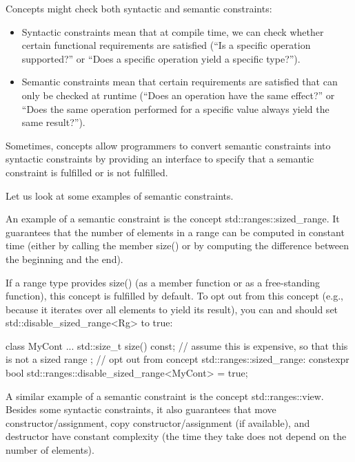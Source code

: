 
Concepts might check both syntactic and semantic constraints:

\begin{itemize}
\item
Syntactic constraints mean that at compile time, we can check whether certain functional requirements are satisfied (“Is a specific operation supported?” or “Does a specific operation yield a specific type?”).

\item
Semantic constraints mean that certain requirements are satisfied that can only be checked at runtime (“Does an operation have the same effect?” or “Does the same operation performed for a specific value always yield the same result?”).
\end{itemize}

Sometimes, concepts allow programmers to convert semantic constraints into syntactic constraints by providing an interface to specify that a semantic constraint is fulfilled or is not fulfilled.


Let us look at some examples of semantic constraints.


An example of a semantic constraint is the concept std::ranges::sized\_range. It guarantees that the number of elements in a range can be computed in constant time (either by calling the member size() or by computing the difference between the beginning and the end).

If a range type provides size() (as a member function or as a free-standing function), this concept is fulfilled by default. To opt out from this concept (e.g., because it iterates over all elements to yield its result), you can and should set std::disable\_sized\_range<Rg> to true:

\begin{cpp}
class MyCont {
	...
	std::size_t size() const; // assume this is expensive, so that this is not a sized range
};
// opt out from concept std::ranges::sized_range:
constexpr bool std::ranges::disable_sized_range<MyCont> = true;
\end{cpp}


A similar example of a semantic constraint is the concept std::ranges::view. Besides some syntactic constraints, it also guarantees that move constructor/assignment, copy constructor/assignment (if available), and destructor have constant complexity (the time they take does not depend on the number of elements).

